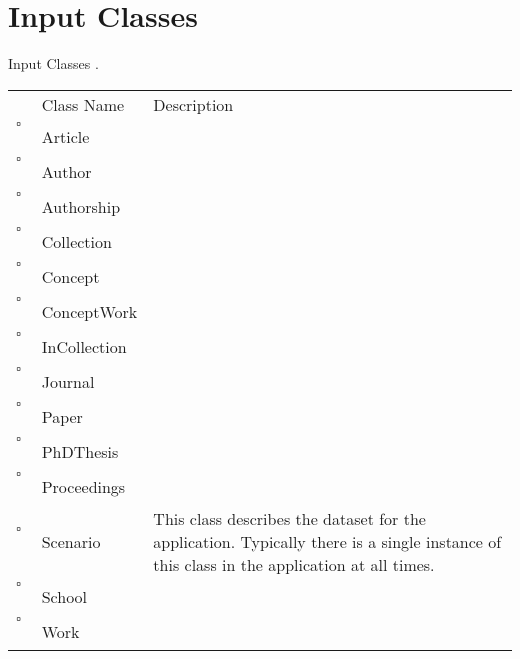 \chapter{Input Classes}
Input Classes     .
\begin{longtable}{llp{8cm}}
& Class Name & Description \\
$\square$\ & Article &  \\
$\square$\ & Author &  \\
$\square$\ & Authorship &  \\
$\square$\ & Collection &  \\
$\square$\ & Concept &  \\
$\square$\ & ConceptWork &  \\
$\square$\ & InCollection &  \\
$\square$\ & Journal &  \\
$\square$\ & Paper &  \\
$\square$\ & PhDThesis &  \\
$\square$\ & Proceedings &  \\
$\square$\ & Scenario & This class describes the dataset for the application. Typically there is a single instance of this class in the application at all times. \\
$\square$\ & School &  \\
$\square$\ & Work &  \\
\end{longtable}
